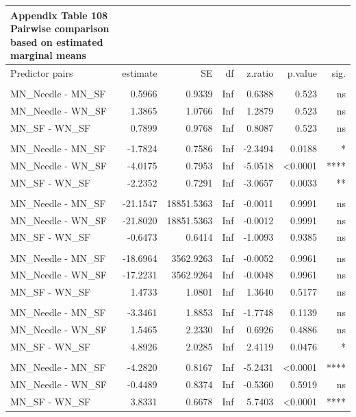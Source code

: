 \documentclass[
  12pt,
  letterpaper,
]{article}
\begin{document}
\begin{longtable}{l|rrrrrr}
\caption*{
{\large \textbf{Appendix Table 108}} \\ 
{\small \textbf{Pairwise comparison based on estimated marginal means}}
} \\ 
\toprule
\multicolumn{1}{l}{Predictor pairs} & estimate & SE & df & z.ratio & p.value & sig. \\ 
\midrule\addlinespace[2.5pt]
\multicolumn{7}{l}{Brain} \\ 
\midrule\addlinespace[2.5pt]
MN\_Needle - MN\_SF & 0.5966 & 0.9339 & Inf & 0.6388 & 0.523 & ns \\ 
MN\_Needle - WN\_SF & 1.3865 & 1.0766 & Inf & 1.2879 & 0.523 & ns \\ 
MN\_SF - WN\_SF & 0.7899 & 0.9768 & Inf & 0.8087 & 0.523 & ns \\ 
\midrule\addlinespace[2.5pt]
\multicolumn{7}{l}{Ear} \\ 
\midrule\addlinespace[2.5pt]
MN\_Needle - MN\_SF & -1.7824 & 0.7586 & Inf & -2.3494 & 0.0188 & * \\ 
MN\_Needle - WN\_SF & -4.0175 & 0.7953 & Inf & -5.0518 & <0.0001 & **** \\ 
MN\_SF - WN\_SF & -2.2352 & 0.7291 & Inf & -3.0657 & 0.0033 & ** \\ 
\midrule\addlinespace[2.5pt]
\multicolumn{7}{l}{Eye} \\ 
\midrule\addlinespace[2.5pt]
MN\_Needle - MN\_SF & -21.1547 & 18851.5363 & Inf & -0.0011 & 0.9991 & ns \\ 
MN\_Needle - WN\_SF & -21.8020 & 18851.5363 & Inf & -0.0012 & 0.9991 & ns \\ 
MN\_SF - WN\_SF & -0.6473 & 0.6414 & Inf & -1.0093 & 0.9385 & ns \\ 
\midrule\addlinespace[2.5pt]
\multicolumn{7}{l}{Liver} \\ 
\midrule\addlinespace[2.5pt]
MN\_Needle - MN\_SF & -18.6964 & 3562.9263 & Inf & -0.0052 & 0.9961 & ns \\ 
MN\_Needle - WN\_SF & -17.2231 & 3562.9264 & Inf & -0.0048 & 0.9961 & ns \\ 
MN\_SF - WN\_SF & 1.4733 & 1.0801 & Inf & 1.3640 & 0.5177 & ns \\ 
\midrule\addlinespace[2.5pt]
\multicolumn{7}{l}{Paw} \\ 
\midrule\addlinespace[2.5pt]
MN\_Needle - MN\_SF & -3.3461 & 1.8853 & Inf & -1.7748 & 0.1139 & ns \\ 
MN\_Needle - WN\_SF & 1.5465 & 2.2330 & Inf & 0.6926 & 0.4886 & ns \\ 
MN\_SF - WN\_SF & 4.8926 & 2.0285 & Inf & 2.4119 & 0.0476 & * \\ 
\midrule\addlinespace[2.5pt]
\multicolumn{7}{l}{Spleen} \\ 
\midrule\addlinespace[2.5pt]
MN\_Needle - MN\_SF & -4.2820 & 0.8167 & Inf & -5.2431 & <0.0001 & **** \\ 
MN\_Needle - WN\_SF & -0.4489 & 0.8374 & Inf & -0.5360 & 0.5919 & ns \\ 
MN\_SF - WN\_SF & 3.8331 & 0.6678 & Inf & 5.7403 & <0.0001 & **** \\ 
\bottomrule
\end{longtable}
\end{document}
